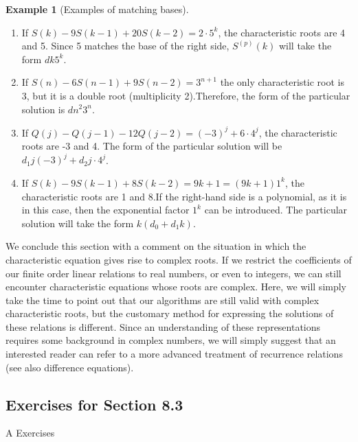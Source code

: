 \documentclass[10pt,]{book}
\theoremstyle{plain}
\theoremstyle{definition}
\theoremstyle{definition}
\theoremstyle{definition}
\newtheorem{example}[theorem]{Example}
\theoremstyle{definition}
\numberwithin{equation}{section}
\begin{document}
\begin{example}[Examples of matching bases]\label{ex-base-match}
\leavevmode%
\begin{enumerate}[label=\alph*]
\item\hypertarget{li-70}{} If  \(S(k) - 9S(k - 1) + 20 S(k - 2) = 2\cdot 5^k\), the characteristic roots are 4 and 5.  Since 5 matches the base of the right side, \(S^{(p)}(k)\) will take the form \(d k 5^k\).%
\item\hypertarget{li-71}{} If \(S(n)- 6S(n - 1) + 9 S(n - 2) = 3^{n+1}\) the only characteristic root is 3, but it is a double root (multiplicity 2).Therefore, the
form of the particular solution is \(d n^2 3^n\).%
\item\hypertarget{li-72}{} If \(Q(j)-Q(j-1)-12Q(j-2)=(-3)^j+ 6\cdot 4^j\), the characteristic roots are -3 and 4. The form of the particular solution will
be \(d_1j (-3)^j+ d_2j\cdot 4^j\).%
\item\hypertarget{li-73}{} If \(S(k) - 9S(k - 1) + 8S(k- 2) = 9k + 1 = (9k + 1)1^k\), the characteristic roots are 1 and 8.If the right-hand side is a polynomial,
as it is in this case, then the exponential factor \(1^k\) can be introduced. The particular solution will take the form \(k\left(d_0+ d_1k\right)\).
%
\end{enumerate}
%
\end{example}
\par
We conclude this section with a comment on the situation in which the characteristic equation gives rise to complex roots. If we restrict the coefficients
of our finite order linear relations to real numbers, or even to integers, we can still encounter characteristic equations whose roots are complex.
Here, we will simply take the time to point out that our algorithms are still valid with complex characteristic roots, but the customary method for
expressing the solutions of these relations is different. Since an understanding of these representations requires some background in complex numbers,
we will simply suggest that an interested reader can refer to a more advanced treatment of recurrence relations (see also difference equations).%
\typeout{************************************************}
\typeout{************************************************}
\subsection[Exercises for Section 8.3]{Exercises for Section 8.3}\label{exercises-8-3}
\hypertarget{exercisegroup-5}{}\typeout{************************************************}
\typeout{************************************************}
A Exercises%
\par
\end{document}

